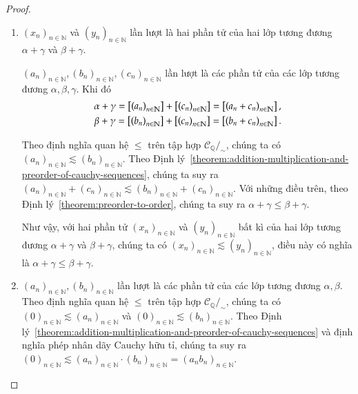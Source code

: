 \begin{proof}
    \begin{enumerate}[label={(\roman*)}]
        \item ${(x_{n})}_{n\in\mathbb{N}}$ và ${(y_{n})}_{n\in\mathbb{N}}$ lần lượt là hai phần tử của hai lớp tương đương $\alpha + \gamma$ và $\beta + \gamma$.

              ${(a_{n})}_{n\in\mathbb{N}}, {(b_{n})}_{n\in\mathbb{N}}, {(c_{n})}_{n\in\mathbb{N}}$ lần lượt là các phần tử của các lớp tương đương $\alpha, \beta, \gamma$. Khi đó
              \[
                  \begin{split}
                      \alpha + \gamma = \left[{\left({a_{n}}\right)}_{{n}\in\mathbb{N}}\right] + \left[{\left({c_{n}}\right)}_{{n}\in\mathbb{N}}\right] = \left[{\left({a_{n} + c_{n}}\right)}_{{n}\in\mathbb{N}}\right], \\
                      \beta + \gamma = \left[{\left({b_{n}}\right)}_{{n}\in\mathbb{N}}\right] + \left[{\left({c_{n}}\right)}_{{n}\in\mathbb{N}}\right] = \left[{\left({b_{n} + c_{n}}\right)}_{{n}\in\mathbb{N}}\right].
                  \end{split}
              \]

              Theo định nghĩa quan hệ $\leq$ trên tập hợp $\mathscr{C}_{\mathbb{Q}}/_{\sim}$, chúng ta có ${(a_{n})}_{n\in\mathbb{N}} \lesssim {(b_{n})}_{n\in\mathbb{N}}$. Theo Định lý~\ref{theorem:addition-multiplication-and-preorder-of-cauchy-sequences}, chúng ta suy ra ${(a_{n})}_{n\in\mathbb{N}} + {(c_{n})}_{n\in\mathbb{N}}\lesssim {(b_{n})}_{n\in\mathbb{N}} + {(c_{n})}_{n\in\mathbb{N}}$. Với những điều trên, theo Định lý~\ref{theorem:preorder-to-order}, chúng ta suy ra $\alpha + \gamma \leq \beta + \gamma$.

              Như vậy, với hai phần tử ${(x_{n})}_{n\in\mathbb{N}}$ và ${(y_{n})}_{n\in\mathbb{N}}$ bất kì của hai lớp tương đương $\alpha + \gamma$ và $\beta + \gamma$, chúng ta có ${(x_{n})}_{n\in\mathbb{N}}\lesssim {(y_{n})}_{n\in\mathbb{N}}$, điều này có nghĩa là $\alpha + \gamma \leq \beta + \gamma$.
        \item  ${(a_{n})}_{n\in\mathbb{N}}, {(b_{n})}_{n\in\mathbb{N}}$ lần lượt là các phần tử của các lớp tương đương $\alpha, \beta$. Theo định nghĩa quan hệ $\leq$ trên tập hợp $\mathscr{C}_{\mathbb{Q}}/_{\sim}$, chúng ta có ${(0)}_{n\in\mathbb{N}}\lesssim {(a_{n})}_{n\in\mathbb{N}}$ và ${(0)}_{n\in\mathbb{N}}\lesssim {(b_{n})}_{n\in\mathbb{N}}$. Theo Định lý~\ref{theorem:addition-multiplication-and-preorder-of-cauchy-sequences} và định nghĩa phép nhân dãy Cauchy hữu tỉ, chúng ta suy ra ${(0)}_{n\in\mathbb{N}} \lesssim {(a_{n})}_{n\in\mathbb{N}}\cdot{(b_{n})}_{n\in\mathbb{N}} = {(a_{n}b_{n})}_{n\in\mathbb{N}}$.


\end{enumerate}
\end{proof}
